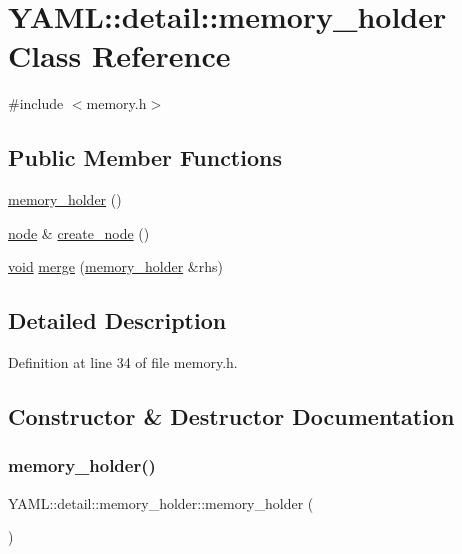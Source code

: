 \hypertarget{class_y_a_m_l_1_1detail_1_1memory__holder}{}\section{Y\+A\+ML\+::detail\+::memory\+\_\+holder Class Reference}
\label{class_y_a_m_l_1_1detail_1_1memory__holder}


{\ttfamily \#include $<$memory.\+h$>$}

\subsection*{Public Member Functions}
\begin{DoxyCompactItemize}
\item 
\mbox{\hyperlink{class_y_a_m_l_1_1detail_1_1memory__holder_a68dfbf6b8b9a3cc72d6bc02446bf409e}{memory\+\_\+holder}} ()
\item 
\mbox{\hyperlink{class_y_a_m_l_1_1detail_1_1node}{node}} \& \mbox{\hyperlink{class_y_a_m_l_1_1detail_1_1memory__holder_afd6ca5191dffb5f3b30f80f7f6d63573}{create\+\_\+node}} ()
\item 
\mbox{\hyperlink{glad_8h_a950fc91edb4504f62f1c577bf4727c29}{void}} \mbox{\hyperlink{class_y_a_m_l_1_1detail_1_1memory__holder_a3df3dee52c6c3432bb77f3b966a6744f}{merge}} (\mbox{\hyperlink{class_y_a_m_l_1_1detail_1_1memory__holder}{memory\+\_\+holder}} \&rhs)
\end{DoxyCompactItemize}


\subsection{Detailed Description}


Definition at line 34 of file memory.\+h.



\subsection{Constructor \& Destructor Documentation}
\mbox{\label{class_y_a_m_l_1_1detail_1_1memory__holder_a68dfbf6b8b9a3cc72d6bc02446bf409e}} 
\subsubsection{\texorpdfstring{memory\_holder()}{memory\_holder()}}
{\footnotesize\ttfamily Y\+A\+M\+L\+::detail\+::memory\+\_\+holder\+::memory\+\_\+holder (\begin{DoxyParamCaption}{ }\end{DoxyParamCaption})\hspace{0.3cm}{\ttfamily [inline]}}



